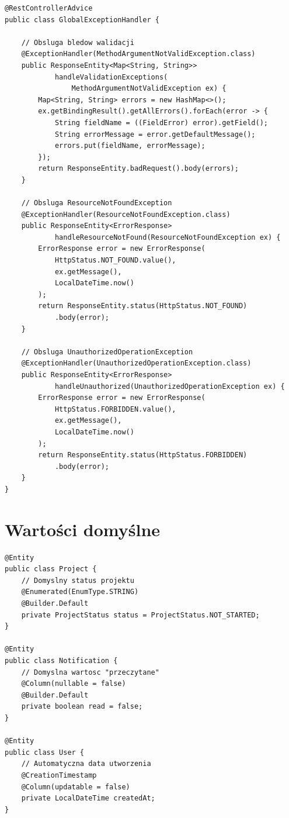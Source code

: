 \documentclass[12pt,a4paper]{report}
\begin{document}
\begin{lstlisting}[style=javastyle, caption={GlobalExceptionHandler}]
@RestControllerAdvice
public class GlobalExceptionHandler {

    // Obsluga bledow walidacji
    @ExceptionHandler(MethodArgumentNotValidException.class)
    public ResponseEntity<Map<String, String>> 
            handleValidationExceptions(
                MethodArgumentNotValidException ex) {
        Map<String, String> errors = new HashMap<>();
        ex.getBindingResult().getAllErrors().forEach(error -> {
            String fieldName = ((FieldError) error).getField();
            String errorMessage = error.getDefaultMessage();
            errors.put(fieldName, errorMessage);
        });
        return ResponseEntity.badRequest().body(errors);
    }

    // Obsluga ResourceNotFoundException
    @ExceptionHandler(ResourceNotFoundException.class)
    public ResponseEntity<ErrorResponse> 
            handleResourceNotFound(ResourceNotFoundException ex) {
        ErrorResponse error = new ErrorResponse(
            HttpStatus.NOT_FOUND.value(),
            ex.getMessage(),
            LocalDateTime.now()
        );
        return ResponseEntity.status(HttpStatus.NOT_FOUND)
            .body(error);
    }

    // Obsluga UnauthorizedOperationException
    @ExceptionHandler(UnauthorizedOperationException.class)
    public ResponseEntity<ErrorResponse> 
            handleUnauthorized(UnauthorizedOperationException ex) {
        ErrorResponse error = new ErrorResponse(
            HttpStatus.FORBIDDEN.value(),
            ex.getMessage(),
            LocalDateTime.now()
        );
        return ResponseEntity.status(HttpStatus.FORBIDDEN)
            .body(error);
    }
}
\end{lstlisting}

\section{Wartości domyślne}

\begin{lstlisting}[style=javastyle, caption={Wartości domyślne w encjach}]
@Entity
public class Project {
    // Domyslny status projektu
    @Enumerated(EnumType.STRING)
    @Builder.Default
    private ProjectStatus status = ProjectStatus.NOT_STARTED;
}

@Entity
public class Notification {
    // Domyslna wartosc "przeczytane"
    @Column(nullable = false)
    @Builder.Default
    private boolean read = false;
}

@Entity
public class User {
    // Automatyczna data utworzenia
    @CreationTimestamp
    @Column(updatable = false)
    private LocalDateTime createdAt;
}
\end{lstlisting}
\end{document}
